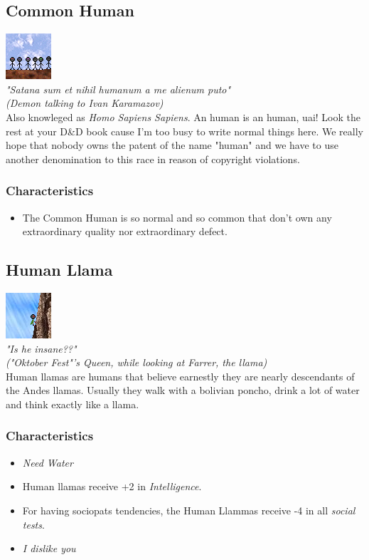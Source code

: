 \documentclass[ letterpaper,12pt]{article}
\begin{document}
\subsection{Common Human}
\includegraphics{../data/races/Img/humano.png}\\
{\it "Satana sum et nihil humanum a me alienum puto"\\
 (Demon talking to Ivan Karamazov)}\\

Also knowleged as {\it Homo Sapiens Sapiens}. An human is an human, uai! Look
the rest at your D\&D book cause I'm too busy to write normal things here. We
really hope that nobody owns the patent of the name "human" and we have to use
another denomination to this race in reason of copyright violations.

\subsubsection{Characteristics}
\begin{itemize}
\item{The Common Human is so normal and so common that don't own any extraordinary quality nor extraordinary defect.}
\end{itemize}

\subsection{Human Llama}
\includegraphics{../data/races/Img/llama.png}\\
{\it "Is he insane??"\\
("Oktober Fest"'s Queen, while looking at Farrer, the llama)}\\

Human llamas are humans that believe earnestly they are nearly descendants of
the Andes llamas. Usually they walk with a bolivian poncho, drink a lot of
water and think exactly like a llama.

\subsubsection{Characteristics}
\begin{itemize}
\item{\it Need Water}
\item{Human llamas receive +2 in {\it Intelligence}.}
\item{For having sociopats tendencies, the Human Llammas receive -4 in all {\it social tests}.}
\item{{\it I dislike you}}
\end{itemize}
\end{document}

